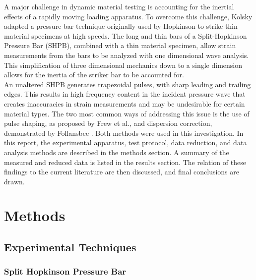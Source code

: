 \documentclass[12pt]{article}
\begin{document}
A major challenge in dynamic material testing is accounting for the inertial effects of a rapidly moving loading apparatus. To overcome this challenge, Kolsky adapted a pressure bar technique originally used by Hopkinson to strike thin material specimens at high speeds\cite{Kolsky}. The long and thin bars of a Split-Hopkinson Pressure Bar (SHPB), combined with a thin material specimen, allow strain measurements from the bars to be analyzed with one dimensional wave analysis. This simplification of three dimensional mechanics down to a single dimension allows for the inertia of the striker bar to be accounted for.\\

An unaltered SHPB generates trapezoidal pulses, with sharp leading and trailing edges. This results in high frequency content in the incident pressure wave that creates inaccuracies in strain measurements and may be undesirable for certain material types. The two most common ways of addressing this issue is the use of pulse shaping, as proposed by Frew et al., and dispersion correction, demonstrated by Follansbee \cite{Frew2002} \cite{Follansbee}. Both methods were used in this investigation. In this report, the experimental apparatus, test protocol, data reduction, and data analysis methods are described in the methods section. A summary of the measured and reduced data is listed in the results section. The relation of these findings to the current literature are then discussed, and final conclusions are drawn. \\



\section{Methods}

\subsection{Experimental Techniques} 

\subsubsection {Split Hopkinson Pressure Bar} %
\end{document}
